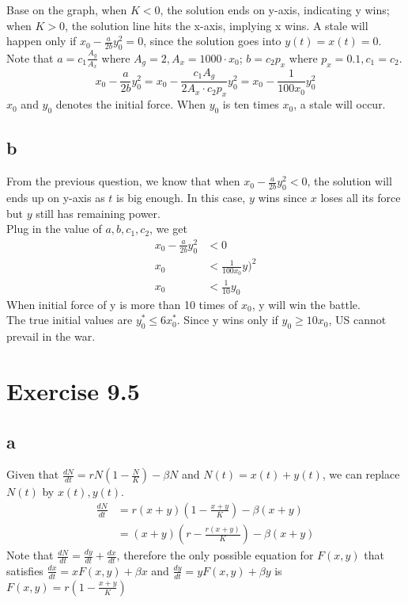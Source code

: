 \documentclass[11pt,letterpaper]{article}
\begin{document}
\noindent Base on the graph, when $K < 0$, the solution ends on y-axis, indicating y wins; when $K > 0$, the solution line hits the x-axis, implying x wins. A stale will happen only if $x_0 - \frac{a}{2b} y_0^2 = 0$, since the solution goes into $y(t) = x(t) = 0$. \\

\noindent Note that $a = c_1 \frac{A_g}{A_x}$ where $A_g = 2, A_x = 1000 \cdot x_0$; $b = c_2 p_x$ where $p_x = 0.1, c_1 = c_2$.
\begin{equation*}
x_0 - \frac{a}{2b} y_0^2 = x_0 - \frac{c_1 A_g}{ 2 A_x \cdot c_2 p_x} y_0^2 = x_0 - \frac{1}{100 x_0} y_0^2
\end{equation*}
\noindent $x_0$ and $y_0$ denotes the initial force. When $y_0$ is ten times $x_0$, a stale will occur. \\

\subsection*{b}
\noindent From the previous question, we know that when $x_0 - \frac{a}{2b} y_0^2 < 0$, the solution will ends up on y-axis as $t$ is big enough. In this case, $y$ wins since $x$ loses all its force but $y$ still has remaining power. \\

\noindent Plug in the value of $a, b, c_1, c_2$, we get 
\begin{align*}
x_0 - \frac{a}{2b} y_0^2  &< 0 \\
x_0 &< \frac{1}{100 x_0} y)^2 \\
x_0 &< \frac{1}{10} y_0
\end{align*}
\noindent When initial force of y is more than 10 times of $x_0$, y will win the battle. \\

\noindent The true initial values are $y^*_0 \leq 6 x^*_0$. Since y wins only if $y_0 \geq 10 x_0$, US cannot prevail in the war. 

\section*{Exercise 9.5}
\subsection*{a}
\noindent Given that $\frac{dN}{dt} = rN(1 - \frac{N}{K} ) - \beta N$ and $N(t) = x(t) + y(t)$, we can replace $N(t)$ by $x(t), y(t)$.
\begin{align*}
\frac{d N}{dt} &= r(x + y) (1 - \frac{x + y}{K} )- \beta (x + y) \\
&= (x + y) (r - \frac{r (x + y)}{K} )- \beta (x + y)
\end{align*}
\noindent Note that $\frac{d N}{dt} = \frac{dy}{dt} + \frac{dx}{dt}$, therefore the only possible equation for $F(x, y)$ that satisfies $\frac{dx}{dt} = x F(x,y) + \beta x$ and $\frac{dy}{dt} = y F(x,y) + \beta y$ is $F(x, y) = r(1 - \frac{x + y}{K})$ \\
\end{document}
